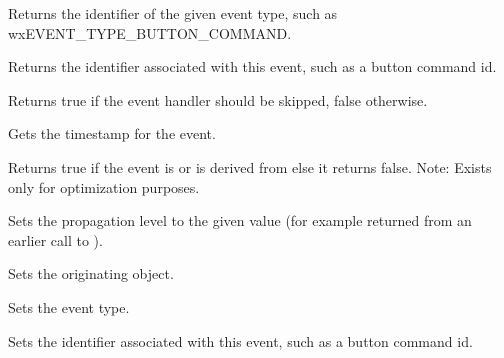 Returns the identifier of the given event type,
such as wxEVENT\_TYPE\_BUTTON\_COMMAND.



Returns the identifier associated with this event, such as a button command id.



Returns true if the event handler should be skipped, false otherwise.



Gets the timestamp for the event.

\label{wxeventiscommandevent}


Returns true if the event is or is derived from
 else it returns false.
Note: Exists only for optimization purposes.


\label{wxeventresumepropagation}


Sets the propagation level to the given value (for example returned from an
earlier call to ).




Sets the originating object.



Sets the event type.



Sets the identifier associated with this event, such as a button command id.



